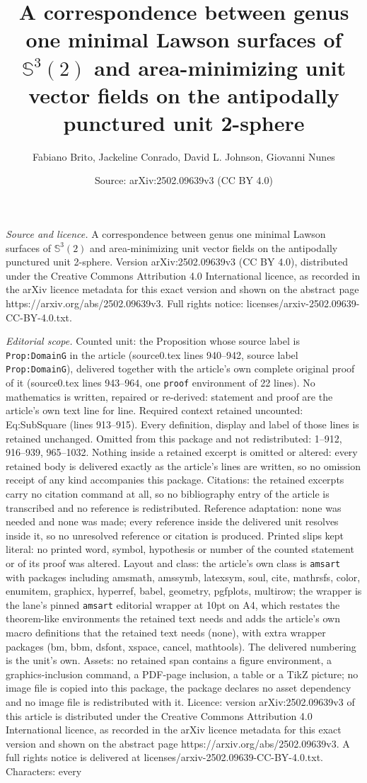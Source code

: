 \documentclass[10pt,a4paper]{amsart}
\title[A correspondence between genus one minimal Lawson surfaces o]{A correspondence between genus one minimal Lawson surfaces of $\mathbb{S}^3(2)$ and area-minimizing unit vector fields on the antipodally punctured unit 2-sphere}
\author{Fabiano Brito, Jackeline Conrado, David L. Johnson, Giovanni Nunes}
\date{Source: arXiv:2502.09639v3 (CC BY 4.0)}
\begin{document}
\maketitle

\noindent\emph{Source and licence.} A correspondence between genus one minimal Lawson surfaces of $\mathbb{S}^3(2)$ and area-minimizing unit vector fields on the antipodally punctured unit 2-sphere. Version arXiv:2502.09639v3 (CC BY 4.0), distributed under the Creative Commons Attribution 4.0 International licence, as recorded in the arXiv licence metadata for this exact version and shown on the abstract page https://arxiv.org/abs/2502.09639v3. Full rights notice: licenses/arxiv-2502.09639-CC-BY-4.0.txt.\par\smallskip

\noindent\textit{Editorial scope.} Counted unit: the Proposition whose source label is \texttt{Prop:DomainG} in the article (source0.tex lines 940--942, source label \texttt{Prop:DomainG}), delivered together with the article's own complete original proof of it (source0.tex lines 943--964, one \texttt{proof} environment of 22 lines). No mathematics is written, repaired or re-derived: statement and proof are the article's own text line for line. Required context retained uncounted: Eq:SubSquare (lines 913--915). Every definition, display and label of those lines is retained unchanged. Omitted from this package and not redistributed: 1--912, 916--939, 965--1032. Nothing inside a retained excerpt is omitted or altered: every retained body is delivered exactly as the article's lines are written, so no omission receipt of any kind accompanies this package. Citations: the retained excerpts carry no citation command at all, so no bibliography entry of the article is transcribed and no reference is redistributed. Reference adaptation: none was needed and none was made; every reference inside the delivered unit resolves inside it, so no unresolved reference or citation is produced. Printed slips kept literal: no printed word, symbol, hypothesis or number of the counted statement or of its proof was altered. Layout and class: the article's own class is \texttt{amsart} with packages including amsmath, amssymb, latexsym, soul, cite, mathrsfs, color, enumitem, graphicx, hyperref, babel, geometry, pgfplots, multirow; the wrapper is the lane's pinned \texttt{amsart} editorial wrapper at 10pt on A4, which restates the theorem-like environments the retained text needs and adds the article's own macro definitions that the retained text needs (none), with extra wrapper packages (bm, bbm, dsfont, xspace, cancel, mathtools). The delivered numbering is the unit's own. Assets: no retained span contains a figure environment, a graphics-inclusion command, a PDF-page inclusion, a table or a TikZ picture; no image file is copied into this package, the package declares no asset dependency and no image file is redistributed with it. Licence: version arXiv:2502.09639v3 of this article is distributed under the Creative Commons Attribution 4.0 International licence, as recorded in the arXiv licence metadata for this exact version and shown on the abstract page https://arxiv.org/abs/2502.09639v3. A full rights notice is delivered at licenses/arxiv-2502.09639-CC-BY-4.0.txt. Characters: every 
\end{document}
